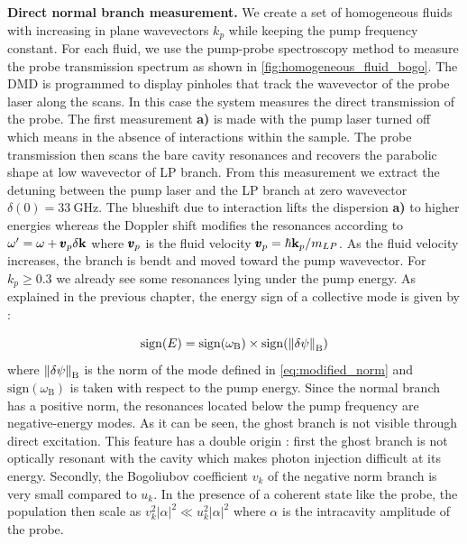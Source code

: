 \textbf{Direct normal branch measurement.} We create a set of homogeneous fluids with increasing in plane wavevectors $k_p$ while keeping the pump frequency constant. 
For each fluid, we use the pump-probe spectroscopy method to measure the probe transmission spectrum as shown in \autoref{fig:homogeneous_fluid_bogo}. 
The DMD is programmed to display pinholes that track the wavevector of the probe laser along the scans. In this case the system measures the direct transmission of the probe. The first measurement \textbf{a)} is made with the pump laser turned off which means in the absence of interactions within the sample.
The probe transmission then scans the bare cavity resonances and recovers the parabolic shape at low wavevector of LP branch. From this measurement we extract the detuning between the pump laser and the LP branch at zero wavevector
 $\delta(0) = \SI{33}{\giga\hertz}$. 
 The blueshift due to interaction lifts the dispersion \textbf{a)} to higher energies whereas the Doppler shift modifies the resonances according to 
 $\omega' = \omega + \pmb{v}_p\delta \mathbf{k}$ where $\pmb{v}_p$ is the fluid velocity $\pmb{v}_p = \hbar \mathbf{k}_p/m_{LP}$.  As the fluid velocity increases, the branch is bendt and moved toward the pump wavevector. 
 For $k_p\geq 0.3$ we already see some resonances lying under the pump energy. As explained in the previous chapter, the energy sign of a collective mode is given by :
 
 \begin{equation}
    \mathrm{sign}(E)=\mathrm{sign}(\omega_\mathrm{B})\times \mathrm{sign}(\norm{\delta \psi}_\mathrm{B}) 
 \end{equation}
where $\norm{\delta \psi}_\mathrm{B}$  is the norm of the mode defined in \autoref{eq:modified_norm} and $\mathrm{sign}(\omega_\mathrm{B})$ is taken with respect to the pump energy. Since the normal branch has a positive norm, the resonances located
below the pump frequency are negative-energy modes. As it can be seen, the ghost branch is not visible through direct excitation. This feature has a double origin : first the ghost branch is not optically resonant with the cavity which makes photon injection difficult at its energy. Secondly,
the Bogoliubov coefficient $v_k$ of the negative norm branch is very small compared to $u_k$.  In the presence of
a coherent state like the probe, the population then scale as $v_k^2 |\alpha|^2\ll u_k^2|\alpha|^2$ where $\alpha$ is the intracavity amplitude of the probe. 

